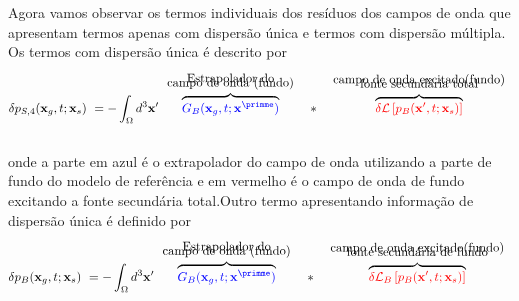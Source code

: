 Agora vamos observar os termos individuais dos resíduos dos campos de onda que apresentam termos apenas com dispersão única  e termos com dispersão múltipla. Os termos com dispersão única é descrito por \\
\begin{eqnarray}
\delta p_{S,4}(\mathbf{x}_{g}, t; \mathbf{x}_s) ~= - \int_{\Omega} d^3\mathbf{x}^{\prime} 
\overbrace{\color{blue}G_B(\mathbf{x}_{g}, t; \mathbf{x}^{\primme})}^{\begin{array}{c}
\text{Estrapolador do} \\[-3mm]
 \text{campo de onda (fundo)}\end{array}} ~~*~~ 
                 \overbrace{{\color{red}\delta\mathcal{L}\left[p_B(\mathbf{x}^{\prime}, t;
                            \mathbf{x}_s)\right]}}^{\begin{array}{c}
                            \text{campo de onda excitado(fundo)} \\[-3mm]
                            \text{fonte secundária total} \end{array}}
\label{eq:single_scattering1}
\end{eqnarray}\\
onde a parte em azul é o extrapolador do campo de onda utilizando a parte de fundo do modelo de referência e em vermelho é o campo de onda de fundo excitando a fonte secundária total.Outro termo apresentando informação de dispersão única é definido por \\
\begin{eqnarray}
\delta p_{B}(\mathbf{x}_{g}, t; \mathbf{x}_s) ~= - \int_{\Omega} d^3\mathbf{x}^{\prime} 
\overbrace{\color{blue}G_B(\mathbf{x}_{g}, t; \mathbf{x}^{\primme})}^{\begin{array}{c}
\text{Estrapolador do} \\[-3mm]
 \text{campo de onda (fundo)}\end{array}} ~~*~~ 
                 \overbrace{{\color{red}\delta\mathcal{L}_{B}\left[p_B(\mathbf{x}^{\prime}, t;
                            \mathbf{x}_s)\right]}}^{\begin{array}{c}
                            \text{campo de onda excitado(fundo)} \\[-3mm]
                            \text{fonte secundária de fundo} \end{array}}
\label{eq:single_scattering2}
\end{eqnarray}

\\

